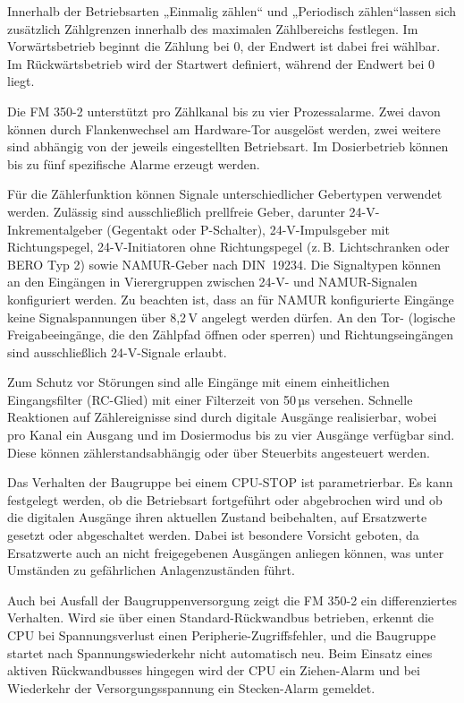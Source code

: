 Innerhalb der Betriebsarten „Einmalig zählen“ und „Periodisch zählen“lassen sich zusätzlich Zählgrenzen innerhalb des maximalen Zählbereichs festlegen. Im Vorwärtsbetrieb beginnt die Zählung bei 0, der Endwert ist dabei frei wählbar. Im Rückwärtsbetrieb wird der Startwert definiert, während der Endwert bei 0 liegt.

Die FM 350-2 unterstützt pro Zählkanal bis zu vier Prozessalarme. Zwei davon können durch Flankenwechsel am Hardware-Tor ausgelöst werden, zwei weitere sind abhängig von der jeweils eingestellten Betriebsart. Im Dosierbetrieb können bis zu fünf spezifische Alarme erzeugt werden.

Für die Zählerfunktion können Signale unterschiedlicher Gebertypen verwendet werden. Zulässig sind ausschließlich prellfreie Geber, darunter 24-V-Inkrementalgeber (Gegentakt oder P-Schalter), 24-V-Impulsgeber mit Richtungspegel, 24-V-Initiatoren ohne Richtungspegel (z.\,B. Lichtschranken oder BERO Typ 2) sowie NAMUR-Geber nach DIN~19234. Die Signaltypen können an den Eingängen in Vierergruppen zwischen 24-V- und NAMUR-Signalen konfiguriert werden. Zu beachten ist, dass an für NAMUR konfigurierte Eingänge keine Signalspannungen über 8{,}2\,V angelegt werden dürfen. An den Tor- (logische Freigabeeingänge, die den Zählpfad öffnen oder sperren) und Richtungseingängen sind ausschließlich 24-V-Signale erlaubt.

Zum Schutz vor Störungen sind alle Eingänge mit einem einheitlichen Eingangsfilter (RC-Glied) mit einer Filterzeit von 50\,µs versehen. Schnelle Reaktionen auf Zählereignisse sind durch digitale Ausgänge realisierbar, wobei pro Kanal ein Ausgang und im Dosiermodus bis zu vier Ausgänge verfügbar sind. Diese können zählerstandsabhängig oder über Steuerbits angesteuert werden.

Das Verhalten der Baugruppe bei einem CPU-STOP ist parametrierbar. Es kann festgelegt werden, ob die Betriebsart fortgeführt oder abgebrochen wird und ob die digitalen Ausgänge ihren aktuellen Zustand beibehalten, auf Ersatzwerte gesetzt oder abgeschaltet werden. Dabei ist besondere Vorsicht geboten, da Ersatzwerte auch an nicht freigegebenen Ausgängen anliegen können, was unter Umständen zu gefährlichen Anlagenzuständen führt.

Auch bei Ausfall der Baugruppenversorgung zeigt die FM 350-2 ein differenziertes Verhalten. Wird sie über einen Standard-Rückwandbus betrieben, erkennt die CPU bei Spannungsverlust einen Peripherie-Zugriffsfehler, und die Baugruppe startet nach Spannungswiederkehr nicht automatisch neu. Beim Einsatz eines aktiven Rückwandbusses hingegen wird der CPU ein Ziehen-Alarm und bei Wiederkehr der Versorgungsspannung ein Stecken-Alarm gemeldet.

